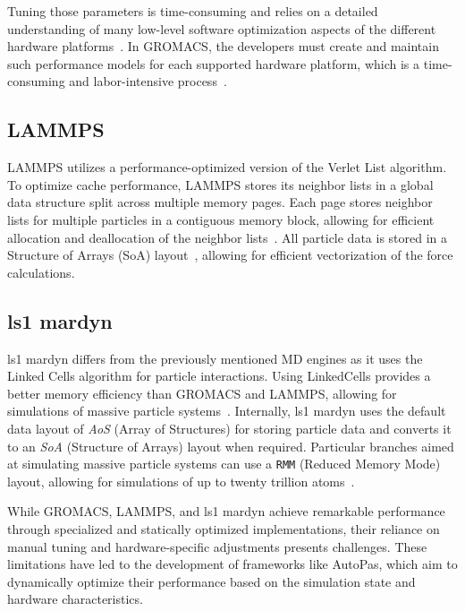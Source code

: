 \documentclass[conference]{IEEEtran}
\begin{document}
Tuning those parameters is time-consuming and relies on a detailed understanding of many low-level software optimization aspects of the different hardware platforms~\cite{PALL20132641}. In GROMACS, the developers must create and maintain such performance models for each supported hardware platform, which is a time-consuming and labor-intensive process~\cite{PALL20132641}.

\subsection{LAMMPS}

LAMMPS utilizes a performance-optimized version of the Verlet List algorithm. To optimize cache performance, LAMMPS stores its neighbor lists in a global data structure split across multiple memory pages. Each page stores neighbor lists for multiple particles in a contiguous memory block, allowing for efficient allocation and deallocation of the neighbor lists~\cite{THOMPSON2022108171}. All particle data is stored in a Structure of Arrays (SoA) layout~\cite{THOMPSON2022108171}, allowing for efficient vectorization of the force calculations.

\subsection{ls1 mardyn}

ls1 mardyn differs from the previously mentioned MD engines as it uses the Linked Cells algorithm for particle interactions. Using LinkedCells provides a better memory efficiency than GROMACS and LAMMPS, allowing for simulations of massive particle systems~\cite{tchipev2019twe}. Internally, ls1 mardyn uses the default data layout of \textit{AoS} (Array of Structures) for storing particle data and converts it to an \textit{SoA} (Structure of Arrays) layout when required. Particular branches aimed at simulating massive particle systems can use a \texttt{RMM} (Reduced Memory Mode) layout, allowing for simulations of up to twenty trillion atoms~\cite{tchipev2019twe}.

\vspace{0.2cm}

While GROMACS, LAMMPS, and ls1 mardyn achieve remarkable performance through specialized and statically optimized implementations, their reliance on manual tuning and hardware-specific adjustments presents challenges. These limitations have led to the development of frameworks like AutoPas, which aim to dynamically optimize their performance based on the simulation state and hardware characteristics.
\end{document}
